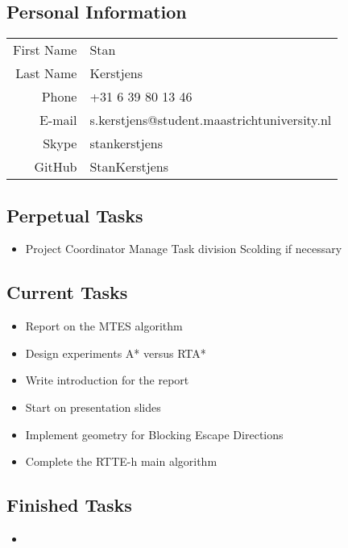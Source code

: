 \subsection{Personal Information}
\begin{table}[h!]
	\begin{tabular}{rl}
	First Name 	& Stan\\
	Last Name	& Kerstjens\\
	Phone		& +31 6 39 80 13 46\\
	E-mail		& s.kerstjens@student.maastrichtuniversity.nl\\
	Skype		& stankerstjens\\
	GitHub		& StanKerstjens
\end{tabular}
\end{table}

\subsection{Perpetual Tasks}
\begin{itemize}
	\item Project Coordinator
		\subitem Manage Task division
		\subitem Scolding if necessary
\end{itemize}

\subsection{Current Tasks}
\begin{itemize}
	\item Report on the MTES algorithm
	\item Design experiments
	\subitem A* versus RTA*
	\item Write introduction for the report
	\item Start on presentation slides
	\item Implement geometry for Blocking Escape Directions
	\item Complete the RTTE-h main algorithm
\end{itemize}

\subsection{Finished Tasks}
\begin{itemize}
\item
\end{itemize}